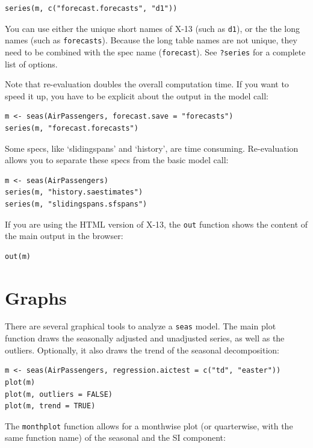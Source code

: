 \begin{verbatim}
series(m, c("forecast.forecasts", "d1"))
\end{verbatim}

You can use either the unique short names of X-13 (such as \texttt{d1}),
or the the long names (such as \texttt{forecasts}). Because the long
table names are not unique, they need to be combined with the spec name
(\texttt{forecast}). See \texttt{?series} for a complete list of
options.

Note that re-evaluation doubles the overall computation time. If you
want to speed it up, you have to be explicit about the output in the
model call:

\begin{verbatim}
m <- seas(AirPassengers, forecast.save = "forecasts")
series(m, "forecast.forecasts")
\end{verbatim}

Some specs, like `slidingspans' and `history', are time consuming.
Re-evaluation allows you to separate these specs from the basic model
call:

\begin{verbatim}
m <- seas(AirPassengers)
series(m, "history.saestimates")
series(m, "slidingspans.sfspans")
\end{verbatim}

If you are using the HTML version of X-13, the \texttt{out} function
shows the content of the main output in the browser:

\begin{verbatim}
out(m)
\end{verbatim}

\section{Graphs}\label{graphs}

There are several graphical tools to analyze a \texttt{seas} model. The
main plot function draws the seasonally adjusted and unadjusted series,
as well as the outliers. Optionally, it also draws the trend of the
seasonal decomposition:

\begin{verbatim}
m <- seas(AirPassengers, regression.aictest = c("td", "easter"))
plot(m)
plot(m, outliers = FALSE)
plot(m, trend = TRUE)
\end{verbatim}

The \texttt{monthplot} function allows for a monthwise plot (or
quarterwise, with the same function name) of the seasonal and the SI
component:

